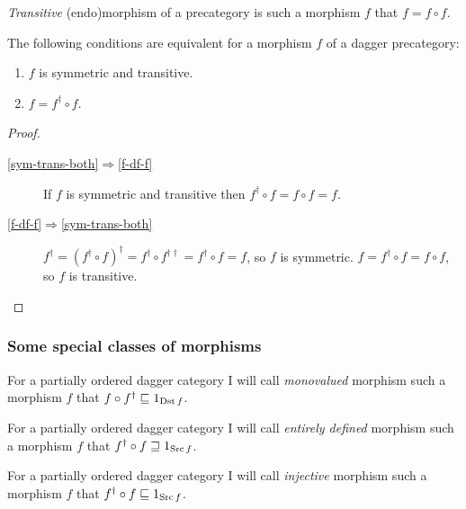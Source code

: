 \begin{defn}
\emph{Transitive} (endo)morphism of a
precategory is such a morphism $f$ that $f=f\circ f$.\end{defn}
\begin{thm}
\label{sym-trans}The following conditions are equivalent for a morphism
$f$ of a dagger precategory:
\begin{enumerate}
\item \label{sym-trans-both}$f$ is symmetric and transitive.
\item \label{f-df-f}$f=f^{\dagger}\circ f$.
\end{enumerate}
\end{thm}
\begin{proof}
~
\begin{description}
\item [{\ref{sym-trans-both}$\Rightarrow$\ref{f-df-f}}] If $f$ is symmetric
and transitive then $f^{\dagger}\circ f=f\circ f=f$.
\item [{\ref{f-df-f}$\Rightarrow$\ref{sym-trans-both}}] $f^{\dagger}=(f^{\dagger}\circ f)^{\dagger}=f^{\dagger}\circ f^{\dagger\dagger}=f^{\dagger}\circ f=f$,
so $f$ is symmetric. $f=f^{\dagger}\circ f=f\circ f$, so $f$ is
transitive.
\end{description}
\end{proof}

\subsubsection{Some special classes of morphisms}
\begin{defn}
For a partially ordered dagger category
I will call \emph{monovalued} morphism such a morphism $f$ that $f\circ f^{\dagger}\sqsubseteq1_{\operatorname{Dst} f}$.
\end{defn}

\begin{defn}
For a partially ordered dagger category
I will call \emph{entirely defined} morphism such a morphism $f$
that $f^{\dagger}\circ f\sqsupseteq1_{\operatorname{Src} f}$.
\end{defn}

\begin{defn}
For a partially ordered dagger category
I will call \emph{injective} morphism such a morphism $f$ that $f^{\dagger}\circ f\sqsubseteq1_{\operatorname{Src} f}$.
\end{defn}

